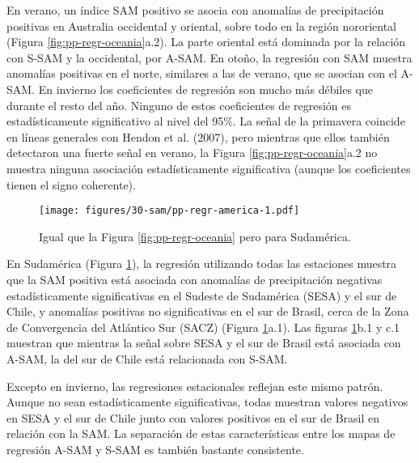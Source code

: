 \documentclass[12pt,oneside]{reedthesis}
\begin{document}
En verano, un índice SAM positivo se asocia con anomalías de precipitación positivas en Australia occidental y oriental, sobre todo en la región nororiental (Figura \ref{fig:pp-regr-oceania}a.2).
La parte oriental está dominada por la relación con S\nobreakdash-SAM y la occidental, por A\nobreakdash-SAM.
En otoño, la regresión con SAM muestra anomalías positivas en el norte, similares a las de verano, que se asocian con el A\nobreakdash-SAM.
En invierno los coeficientes de regresión son mucho más débiles que durante el resto del año.
Ninguno de estos coeficientes de regresión es estadísticamente significativo al nivel del 95\%.
La señal de la primavera coincide en líneas generales con Hendon et al. (2007), pero mientras que ellos también detectaron una fuerte señal en verano, la Figura \ref{fig:pp-regr-oceania}a.2 no muestra ninguna asociación estadísticamente significativa (aunque los coeficientes tienen el signo coherente).


\begin{figure}
\centering
\texttt{[image: figures/30-sam/pp-regr-america-1.pdf]}
\caption{\label{fig:pp-regr-america}Igual que la Figura \ref{fig:pp-regr-oceania} pero para Sudamérica.}
\end{figure}
En Sudamérica (Figura \ref{fig:pp-regr-america}), la regresión utilizando todas las estaciones muestra que la SAM positiva está asociada con anomalías de precipitación negativas estadísticamente significativas en el Sudeste de Sudamérica (SESA) y el sur de Chile, y anomalías positivas no significativas en el sur de Brasil, cerca de la Zona de Convergencia del Atlántico Sur (SACZ) (Figura \ref{fig:pp-regr-america}a.1).
Las figuras \ref{fig:pp-regr-america}b.1 y c.1 muestran que mientras la señal sobre SESA y el sur de Brasil está asociada con A\nobreakdash-SAM, la del sur de Chile está relacionada con S\nobreakdash-SAM.

Excepto en invierno, las regresiones estacionales reflejan este mismo patrón.
Aunque no sean estadísticamente significativas, todas muestran valores negativos en SESA y el sur de Chile junto con valores positivos en el sur de Brasil en relación con la SAM.
La separación de estas características entre los mapas de regresión A\nobreakdash-SAM y S\nobreakdash-SAM es también bastante consistente.
\end{document}
